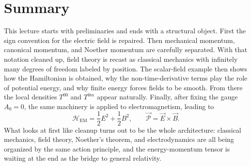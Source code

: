 \section{Summary}

This lecture starts with preliminaries and ends with a structural object. First the sign convention for the electric field is repaired. Then mechanical momentum, canonical momentum, and Noether momentum are carefully separated. With that notation cleaned up, field theory is recast as classical mechanics with infinitely many degrees of freedom labeled by position. The scalar-field example then shows how the Hamiltonian is obtained, why the non-time-derivative terms play the role of potential energy, and why finite energy forces fields to be smooth. From there the local densities \(T^{00}\) and \(T^{0m}\) appear naturally. Finally, after fixing the gauge \(A_0=0\), the same machinery is applied to electromagnetism, leading to
\begin{equation}
\mathcal H_{\mathrm{EM}}=\frac12E^2+\frac12B^2,
\qquad
\vec{\mathcal P}=\vec E\times\vec B.
\end{equation}
What looks at first like cleanup turns out to be the whole architecture: classical mechanics, field theory, Noether's theorem, and electrodynamics are all being organized by the same action principle, and the energy-momentum tensor is waiting at the end as the bridge to general relativity.